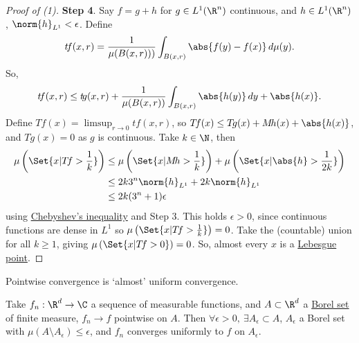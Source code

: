 \documentclass[twoside]{article}
\begin{document}
\begin{proof}[Proof of (1)]
    \textbf{Step 4}.
    Say $f = g+h$ for $g \in L^1(\R^n)$ continuous, and $h \in L^1(\R^n)$, $\norm{h}_{L^1} < \epsilon$.
    Define
    \begin{equation*}
        t\!f(x, r) = \frac{1}{\mu(B(x, r)))} \int_{B(x, r)} \abs{f(y) - f(x)} \, d \mu(y).
    \end{equation*}
    So,
    \begin{equation*}
        t\!f(x, r) \leq t \! g(x, r) + \frac{1}{\mu(B(x, r))} \int_{B(x, r)} \abs{h(y)} \, dy + \abs{h(x)}.
    \end{equation*}
    Define $T \! f (x) = \limsup_{r \to 0} t \! f(x, r)$, so $T\! f(x) \leq T \! g(x) + M \! h(x) + \abs{h(x)}$, and $T\!g(x)  = 0$ as $g$ is continuous.
    Take $k \in \N$, then
    \begin{align*}
        \mu\left(\Set{x | T \! f > \frac{1}{k}}\right) &\leq \mu\left(\Set{x | M \! h > \frac{1}{k}}\right) + \mu\left(\Set{x | \abs{h} > \frac{1}{2k}}\right) \\
                                            &\leq 2k 3^n \norm{h}_{L^1} + 2k \norm{h}_{L^1} \\
                                            &\leq 2k (3^n+1) \epsilon
    \end{align*}
    using \hyperlink{def:chebyshev}{Chebyshev's inequality} and Step 3.
    This holds $\epsilon > 0$, since continuous functions are dense in $L^1$ so $\mu\left(\Set{x | T \! f > \frac{1}{k}}\right) = 0$.
    Take the (countable) union for all $k\geq 1$, giving $\mu\left(\Set{x | T\! f > 0}\right) = 0$.
    So, almost every $x$ is a \hyperlink{def:lebPoint}{Lebesgue point}.
\end{proof}
Pointwise convergence is `almost' uniform convergence.
\begin{thm}\label{thm:egorov}
    Take $f_n: \R^d \to \C$ a sequence of measurable functions, and $A \subset \R^d$ a \hyperlink{def:borelSet}{Borel set} of finite measure, $f_n \to f$ pointwise on $A$.
    Then $\forall \epsilon > 0, \ \exists A_\epsilon \subset A$, $A_\epsilon$ a Borel set with $\mu(A \setminus A_\epsilon) \leq \epsilon$, and $f_n$ converges uniformly to $f$ on $A_\epsilon$.
\end{thm}
\end{document}
